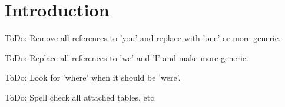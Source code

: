 \documentclass[pdf,ps2pdf,11pt]{SANDreport}
\begin{document}
%
\cleardoublepage   %
\tableofcontents
\listoffigures
\listoftables



%

\SANDmain %


%
\section{Introduction}
%

ToDo: Remove all references to 'you' and replace with 'one' or more
generic.

ToDo: Replace all references to 'we' and 'I' and make more generic.

ToDo: Look for 'where' when it should be 'were'.

ToDo: Spell check all attached tables, etc.
\end{document}
